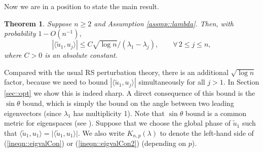 \documentclass[12pt]{article}%
\theoremstyle{plain}%
\newtheorem{thm}{Theorem}[section]
\theoremstyle{remark}
\begin{document}

%
%

Now we are in a position to state the main result.
\begin{thm}\label{thm::main}
Suppose $n \ge 2$ and Assumption \ref{assmp::lambda}. Then, with probability $1 - O(n^{-1})$, 
\begin{equation}\label{ineqn::main1}
|\langle \tilde{u}_1, u_j \rangle| \le C\sqrt{\log n} / (\lambda_1  - \lambda_j), \qquad \forall \, 2 \le j \le n,
\end{equation}
where $C>0$ is an absolute constant. 
\end{thm}

Compared with the usual RS perturbation theory, there is an additional $\sqrt{\log n}$ factor, because we need to bound $|\langle \tilde{u}_1, u_j \rangle|$ simultaneously for all $j > 1$. In Section \ref{sec::opt} we show this is indeed sharp. 
A direct consequence of this bound is the $\sin \theta$ bound, which is simply the bound on the angle between two leading eigenvectors (since $\lambda_1$ has multiplicity 1). Note that $\sin \theta$ bound is a common metric for eigenspaces (see \cite{SteSun90}). Suppose that we choose the global phase of $\tilde{u}_1$ such that $ \langle \tilde{u}_1, u_1 \rangle = \big| \langle \tilde{u}_1, u_1 \rangle \big|$. We also write $K_{n,p}(\lambda)$ to denote the left-hand side of (\ref{ineqn::eigvalCon}) or (\ref{ineqn::eigvalCon2}) (depending on $p$). 
\end{document}

